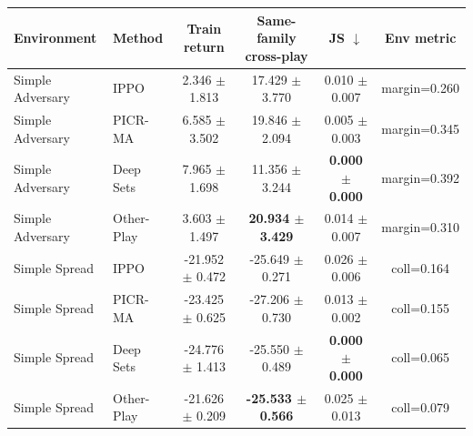\begin{tabular}{llcccc}
\toprule
Environment & Method & Train return & Same-family cross-play & JS $\downarrow$ & Env metric \\
\midrule
Simple Adversary & IPPO & 2.346 $\pm$ 1.813 & 17.429 $\pm$ 3.770 & 0.010 $\pm$ 0.007 & margin=0.260 \\
Simple Adversary & PICR-MA & 6.585 $\pm$ 3.502 & 19.846 $\pm$ 2.094 & 0.005 $\pm$ 0.003 & margin=0.345 \\
Simple Adversary & Deep Sets & 7.965 $\pm$ 1.698 & 11.356 $\pm$ 3.244 & \textbf{0.000 $\pm$ 0.000} & margin=0.392 \\
Simple Adversary & Other-Play & 3.603 $\pm$ 1.497 & \textbf{20.934 $\pm$ 3.429} & 0.014 $\pm$ 0.007 & margin=0.310 \\
\midrule
Simple Spread & IPPO & -21.952 $\pm$ 0.472 & -25.649 $\pm$ 0.271 & 0.026 $\pm$ 0.006 & coll=0.164 \\
Simple Spread & PICR-MA & -23.425 $\pm$ 0.625 & -27.206 $\pm$ 0.730 & 0.013 $\pm$ 0.002 & coll=0.155 \\
Simple Spread & Deep Sets & -24.776 $\pm$ 1.413 & -25.550 $\pm$ 0.489 & \textbf{0.000 $\pm$ 0.000} & coll=0.065 \\
Simple Spread & Other-Play & -21.626 $\pm$ 0.209 & \textbf{-25.533 $\pm$ 0.566} & 0.025 $\pm$ 0.013 & coll=0.079 \\
\bottomrule
\end{tabular}
